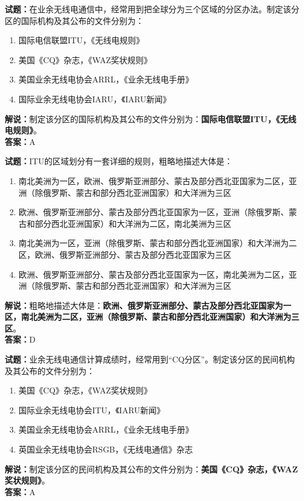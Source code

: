\documentclass{ctexbook}
\begin{document}
\bigskip


\noindent\textbf{试题：}在业余无线电通信中，经常用到把全球分为三个区域的分区办法。制定该分区的国际机构及其公布的文件分别为：
\begin{enumerate}[leftmargin=3em]
\item 国际电信联盟ITU，《无线电规则》
\item 美国《CQ》杂志，《WAZ奖状规则》
\item 美国业余无线电协会ARRL，《业余无线电手册》
\item 国际业余无线电协会IARU，《IARU新闻》
\end{enumerate}
\noindent\textbf{解说：}制定该分区的国际机构及其公布的文件分别为：\textbf{国际电信联盟ITU，《无线电规则》}。\\\noindent\textbf{答案：}A




\bigskip


\noindent\textbf{试题：}ITU的区域划分有一套详细的规则，粗略地描述大体是：
\begin{enumerate}[leftmargin=3em]
\item 南北美洲为一区，欧洲、俄罗斯亚洲部分、蒙古及部分西北亚国家为二区，亚洲（除俄罗斯、蒙古和部分西北亚洲国家）和大洋洲为三区
\item 欧洲、俄罗斯亚洲部分、蒙古及部分西北亚国家为一区，亚洲（除俄罗斯、蒙古和部分西北亚洲国家）和大洋洲为二区，南北美洲为三区%
\item 南北美洲为一区，亚洲（除俄罗斯、蒙古和部分西北亚洲国家）和大洋洲为二区，欧洲、俄罗斯亚洲部分、蒙古及部分西北亚国家为三区
\item 欧洲、俄罗斯亚洲部分、蒙古及部分西北亚国家为一区，南北美洲为二区，亚洲（除俄罗斯、蒙古和部分西北亚洲国家）和大洋洲为三区
\end{enumerate}
\noindent\textbf{解说：}粗略地描述大体是：\textbf{欧洲、俄罗斯亚洲部分、蒙古及部分西北亚国家为一区，南北美洲为二区，亚洲（除俄罗斯、蒙古和部分西北亚洲国家）和大洋洲为三区}。\\\noindent\textbf{答案：}D



\bigskip


\noindent\textbf{试题：}业余无线电通信计算成绩时，经常用到“CQ分区”。制定该分区的民间机构及其公布的文件分别为：
\begin{enumerate}[leftmargin=3em]
\item 美国《CQ》杂志，《WAZ奖状规则》
\item 国际业余无线电协会ITU，《IARU新闻》
\item 美国业余无线电协会ARRL，《业余无线电手册》
\item 英国业余无线电协会RSGB，《无线电通信》杂志
\end{enumerate}
\noindent\textbf{解说：}制定该分区的民间机构及其公布的文件分别为：\textbf{美国《CQ》杂志，《WAZ奖状规则》}。\\\noindent\textbf{答案：}A
\end{document}
